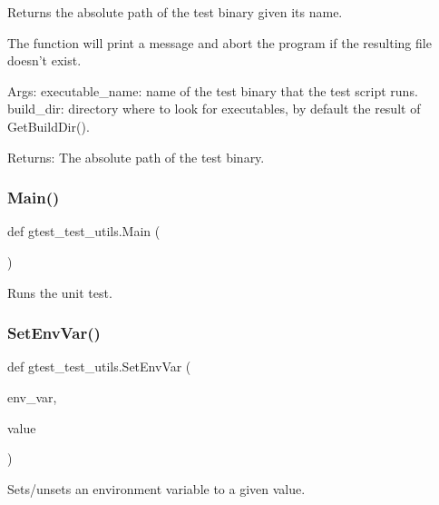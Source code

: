 \begin{DoxyVerb}Returns the absolute path of the test binary given its name.

The function will print a message and abort the program if the resulting file
doesn't exist.

Args:
  executable_name: name of the test binary that the test script runs.
  build_dir:       directory where to look for executables, by default
                   the result of GetBuildDir().

Returns:
  The absolute path of the test binary.
\end{DoxyVerb}
 \mbox{\label{namespacegtest__test__utils_a5361b42d9c6843b5b117ead4d1c58cc5}} 
\subsubsection{\texorpdfstring{Main()}{Main()}}
{\footnotesize\ttfamily def gtest\+\_\+test\+\_\+utils.\+Main (\begin{DoxyParamCaption}{ }\end{DoxyParamCaption})}

\begin{DoxyVerb}Runs the unit test.\end{DoxyVerb}
 \mbox{\label{namespacegtest__test__utils_a616ee0f04e98e54b128cbe492def9bb1}} 
\subsubsection{\texorpdfstring{Set\+Env\+Var()}{SetEnvVar()}}
{\footnotesize\ttfamily def gtest\+\_\+test\+\_\+utils.\+Set\+Env\+Var (\begin{DoxyParamCaption}\item[{}]{env\+\_\+var,  }\item[{}]{value }\end{DoxyParamCaption})}

\begin{DoxyVerb}Sets/unsets an environment variable to a given value.\end{DoxyVerb}
 

